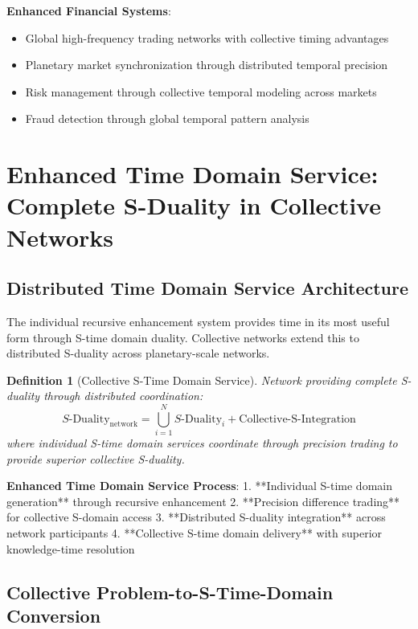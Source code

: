 \documentclass[12pt,a4paper]{article}
\newtheorem{definition}[theorem]{Definition}
\begin{document}
\textbf{Enhanced Financial Systems}:
\begin{itemize}
\item Global high-frequency trading networks with collective timing advantages
\item Planetary market synchronization through distributed temporal precision
\item Risk management through collective temporal modeling across markets
\item Fraud detection through global temporal pattern analysis
\end{itemize}

\section{Enhanced Time Domain Service: Complete S-Duality in Collective Networks}

\subsection{Distributed Time Domain Service Architecture}

The individual recursive enhancement system provides time in its most useful form through S-time domain duality. Collective networks extend this to distributed S-duality across planetary-scale networks.

\begin{definition}[Collective S-Time Domain Service]
Network providing complete S-duality through distributed coordination:
$$S\text{-Duality}_{\text{network}} = \bigcup_{i=1}^{N} S\text{-Duality}_i + \text{Collective-S-Integration}$$
where individual S-time domain services coordinate through precision trading to provide superior collective S-duality.
\end{definition}

\textbf{Enhanced Time Domain Service Process}:
1. **Individual S-time domain generation** through recursive enhancement
2. **Precision difference trading** for collective S-domain access
3. **Distributed S-duality integration** across network participants
4. **Collective S-time domain delivery** with superior knowledge-time resolution

\subsection{Collective Problem-to-S-Time-Domain Conversion}
\end{document}
